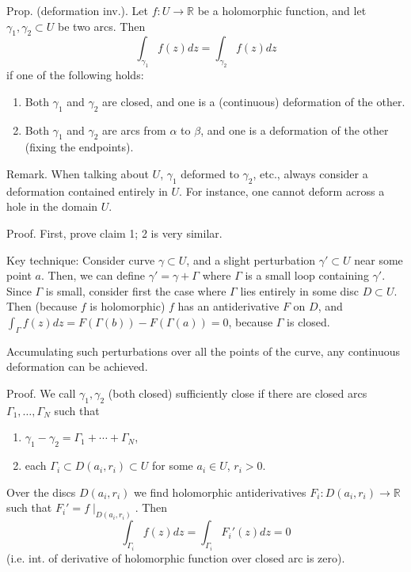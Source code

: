 \documentclass{artikel3}
\date{\formatdate{2012}{04}{13}}
\newcommand{\complex}{\mathbb{R}}
\begin{document}
\newcommand{\eqcite}[1]{\text{[#1]}}
\newcommand{\eqnref}[1]{Stmt. \ref{#1}}
\newcommand{\expval}[1]{\left\langle #1\right\rangle}
\newcommand{\closure}[1]{\overline{#1}}
Prop. (deformation inv.).  Let $f:U\to\complex$ be a holomorphic function,
and let $\gamma_1,\gamma_2\subset U$ be two arcs.  Then \[
	\int_{\gamma_1}f(z)dz=\int_{\gamma_2}f(z)dz
\] if one of the following holds:
\begin{enumerate}
	\item
		Both $\gamma_1$ and $\gamma_2$ are closed, and one is a (continuous) deformation
		of the other.
	\item
		Both $\gamma_1$ and $\gamma_2$ are arcs from $\alpha$ to $\beta$, and one
		is a deformation of the other (fixing the endpoints).
\end{enumerate}

Remark.  When talking about $U$, $\gamma_1$ deformed to
$\gamma_2$, etc., always consider a deformation contained entirely in $U$.  For
instance, one cannot deform across a hole in the domain $U$.

Proof.  First, prove claim 1; 2 is very similar.

Key technique: Consider curve $\gamma\subset U$, and a slight
perturbation $\gamma'\subset U$ near some point $a$.  Then, we can define $\gamma'=\gamma+\Gamma$
where $\Gamma$ is a small loop containing $\gamma'$.  Since $\Gamma$ is small,
consider first the case where $\Gamma$ lies entirely in some disc $D\subset U$.
Then (because $f$ is holomorphic) $f$ has an antiderivative $F$ on $D$,
and $\int_\Gamma f(z)dz=F(\Gamma(b))-F(\Gamma(a))=0$, because
$\Gamma$ is closed.

Accumulating such perturbations over all the points of the curve, any continuous
deformation can be achieved.

Proof.  We call $\gamma_1,\gamma_2$ (both closed) sufficiently close if there are closed
arcs $\Gamma_1,\ldots,\Gamma_N$ such that
\begin{enumerate}
	\item
		$\gamma_1-\gamma_2=\Gamma_1+\cdots+\Gamma_N$,
	\item
		each $\Gamma_i\subset D(a_i,r_i)\subset U$ for some $a_i\in U$, $r_i>0$.
\end{enumerate}

Over the discs $D(a_i,r_i)$ we find holomorphic antiderivatives
$F_i:D(a_i,r_i)\to\complex$ such that $F_i'=f\mid_{D(a_i,r_i)}$.
Then \[
	\int_{\Gamma_i} f(z)dz=\int_{\Gamma_i}F_i'(z)dz=0
\] (i.e. int. of derivative of holomorphic function over closed arc is zero).
\end{document}
